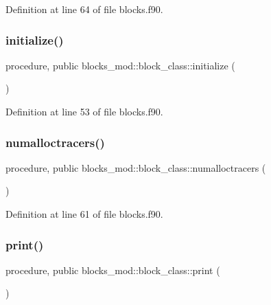 Definition at line 64 of file blocks.\+f90.

\mbox{\label{structblocks__mod_1_1block__class_ad671745ca5dc3227ddb0ed1d9ff45268}} 
\subsubsection{\texorpdfstring{initialize()}{initialize()}}
{\footnotesize\ttfamily procedure, public blocks\+\_\+mod\+::block\+\_\+class\+::initialize (\begin{DoxyParamCaption}{ }\end{DoxyParamCaption})}



Definition at line 53 of file blocks.\+f90.

\mbox{\label{structblocks__mod_1_1block__class_a7a3f2eb6823a683a6aaa2159b50ee990}} 
\subsubsection{\texorpdfstring{numalloctracers()}{numalloctracers()}}
{\footnotesize\ttfamily procedure, public blocks\+\_\+mod\+::block\+\_\+class\+::numalloctracers (\begin{DoxyParamCaption}{ }\end{DoxyParamCaption})}



Definition at line 61 of file blocks.\+f90.

\mbox{\label{structblocks__mod_1_1block__class_a43b4c133934eaadb55d30cf834d1e28c}} 
\subsubsection{\texorpdfstring{print()}{print()}}
{\footnotesize\ttfamily procedure, public blocks\+\_\+mod\+::block\+\_\+class\+::print (\begin{DoxyParamCaption}{ }\end{DoxyParamCaption})}



